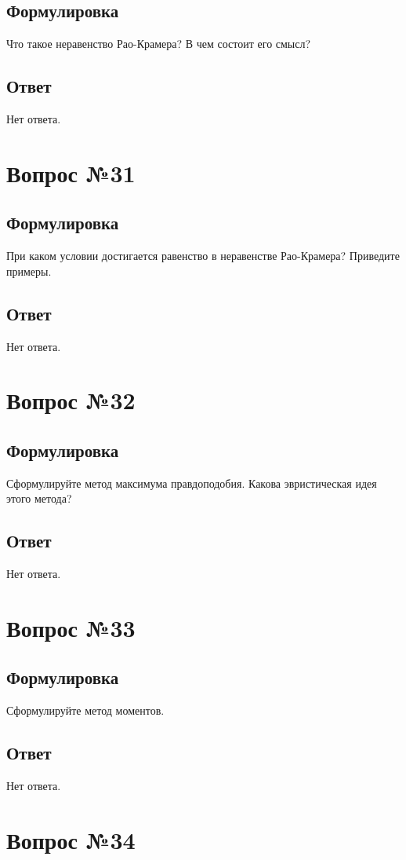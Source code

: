 \documentclass[a4]{article}
\begin{document}
	\subsection*{Формулировка}
	Что такое неравенство Рао-Крамера? В чем состоит его смысл?
	\subsection*{Ответ}
	Нет ответа.
	
	\section{Вопрос №31}
	\subsection*{Формулировка}
	При каком условии достигается равенство в неравенстве Рао-Крамера? Приведите
примеры.
	\subsection*{Ответ}
	Нет ответа.
	
	\section{Вопрос №32}
	\subsection*{Формулировка}
	Сформулируйте метод максимума правдоподобия. Какова эвристическая идея этого
метода?
	\subsection*{Ответ}
	Нет ответа.
	
	\section{Вопрос №33}
	\subsection*{Формулировка}
	Сформулируйте метод моментов.
	\subsection*{Ответ}
	Нет ответа.
	
	\section{Вопрос №34}
\end{document}

